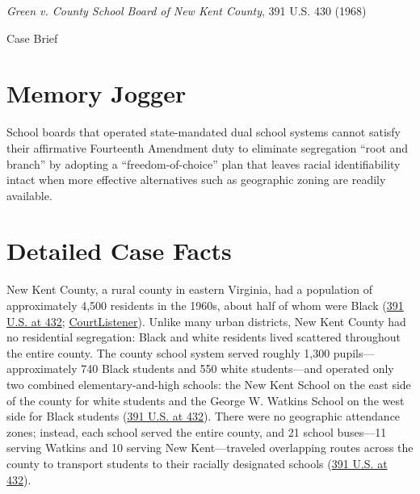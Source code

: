 \documentclass[12pt]{article}
\begin{document}
\begin{center}
{\LARGE \textit{Green v. County School Board of New Kent County}, 391 U.S. 430 (1968)\par}
\vspace{0.8em}
{\large Case Brief\par}
\end{center}
\vspace{1em}

\section{Memory Jogger}

School boards that operated state-mandated dual school systems cannot satisfy their affirmative Fourteenth Amendment duty to eliminate segregation ``root and branch'' by adopting a ``freedom-of-choice'' plan that leaves racial identifiability intact when more effective alternatives such as geographic zoning are readily available.

\section{Detailed Case Facts}

New Kent County, a rural county in eastern Virginia, had a population of approximately 4,500 residents in the 1960s, about half of whom were Black (\href{https://supreme.justia.com/cases/federal/us/391/430/}{391 U.S. at 432}; \href{https://www.courtlistener.com/opinion/107705/green-v-county-school-board-of-new-kent-county/}{CourtListener}). Unlike many urban districts, New Kent County had no residential segregation: Black and white residents lived scattered throughout the entire county. The county school system served roughly 1,300 pupils---approximately 740 Black students and 550 white students---and operated only two combined elementary-and-high schools: the New Kent School on the east side of the county for white students and the George W. Watkins School on the west side for Black students (\href{https://supreme.justia.com/cases/federal/us/391/430/}{391 U.S. at 432}). There were no geographic attendance zones; instead, each school served the entire county, and 21 school buses---11 serving Watkins and 10 serving New Kent---traveled overlapping routes across the county to transport students to their racially designated schools (\href{https://supreme.justia.com/cases/federal/us/391/430/}{391 U.S. at 432}).
\end{document}
